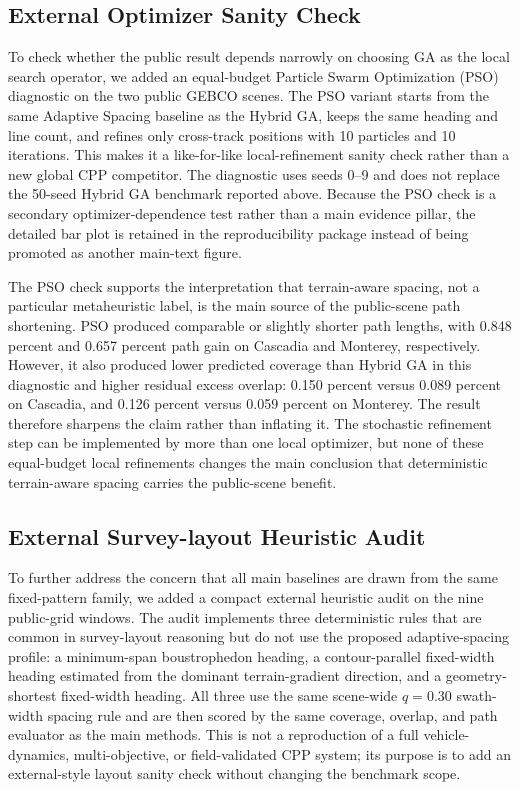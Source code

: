\documentclass[jmse,article,submit,moreauthors]{Definitions/mdpi}
\begin{document}
\subsection{External Optimizer Sanity Check}
To check whether the public result depends narrowly on choosing GA as the local search operator, we added an equal-budget Particle Swarm Optimization (PSO) diagnostic on the two public GEBCO scenes. The PSO variant starts from the same Adaptive Spacing baseline as the Hybrid GA, keeps the same heading and line count, and refines only cross-track positions with 10 particles and 10 iterations. This makes it a like-for-like local-refinement sanity check rather than a new global CPP competitor. The diagnostic uses seeds 0--9 and does not replace the 50-seed Hybrid GA benchmark reported above. Because the PSO check is a secondary optimizer-dependence test rather than a main evidence pillar, the detailed bar plot is retained in the reproducibility package instead of being promoted as another main-text figure.

The PSO check supports the interpretation that terrain-aware spacing, not a particular metaheuristic label, is the main source of the public-scene path shortening. PSO produced comparable or slightly shorter path lengths, with 0.848 percent and 0.657 percent path gain on Cascadia and Monterey, respectively. However, it also produced lower predicted coverage than Hybrid GA in this diagnostic and higher residual excess overlap: 0.150 percent versus 0.089 percent on Cascadia, and 0.126 percent versus 0.059 percent on Monterey. The result therefore sharpens the claim rather than inflating it. The stochastic refinement step can be implemented by more than one local optimizer, but none of these equal-budget local refinements changes the main conclusion that deterministic terrain-aware spacing carries the public-scene benefit.

\subsection{External Survey-layout Heuristic Audit}
To further address the concern that all main baselines are drawn from the same fixed-pattern family, we added a compact external heuristic audit on the nine public-grid windows. The audit implements three deterministic rules that are common in survey-layout reasoning but do not use the proposed adaptive-spacing profile: a minimum-span boustrophedon heading, a contour-parallel fixed-width heading estimated from the dominant terrain-gradient direction, and a geometry-shortest fixed-width heading. All three use the same scene-wide \(q=0.30\) swath-width spacing rule and are then scored by the same coverage, overlap, and path evaluator as the main methods. This is not a reproduction of a full vehicle-dynamics, multi-objective, or field-validated CPP system; its purpose is to add an external-style layout sanity check without changing the benchmark scope.
\end{document}
